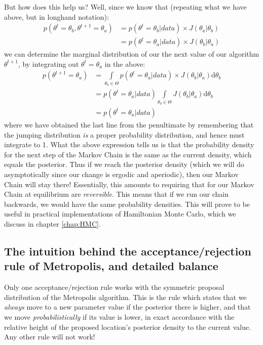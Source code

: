 \documentclass[11pt,fullpage]{book}
\begin{document}
But how does this help us? Well, since we know that (repeating what we have above, but in longhand notation):
%
\begin{align}
p(\theta^{t} = \theta_b,\theta^{t+1}=\theta_a) &=  p(\theta^t=\theta_b|data)\times J(\theta_a|\theta_b)\\
&= p(\theta^t=\theta_a|data)\times J(\theta_b|\theta_a)
\end{align}
%
we can determine the marginal distribution of our the next value of our algorithm $\theta^{t+1}$, by integrating out $\theta^t=\theta_a$ in the above:
%
\begin{align}
p(\theta^{t+1}=\theta_a) &=  \int\limits_{\theta_b\in\Theta} p(\theta^t=\theta_a|data)\times J(\theta_b|\theta_a) \mathrm{d}\theta_b\\
&= p(\theta^t=\theta_a|data)\int\limits_{\theta_b\in\Theta}J(\theta_b|\theta_a) \mathrm{d}\theta_b\\
&= p(\theta^t=\theta_a|data)
\end{align}
%
where we have obtained the last line from the penultimate by remembering that the jumping distribution \textit{is} a proper probability distribution, and hence must integrate to 1. What the above expression tells us is that the probability density for the next step of the Markov Chain is the same as the current density, which equals the posterior. Thus if we reach the posterior density (which we will do asymptotically since our change is ergodic and aperiodic), then our Markov Chain will stay there!  Essentially, this amounts to requiring that for our Markov Chain at equilibrium are \textit{reversible}. This means that if we run our chain backwards, we would have the same probability densities. This will prove to be useful in practical implementations of Hamiltonian Monte Carlo, which we discuss in chapter \ref{chap:HMC}.

\subsection{The intuition behind the acceptance/rejection rule of Metropolis, and detailed balance}\label{sec:metropolisHastings_correctAcceptRejectRuleDetailedBalance}
Only one acceptance/rejection rule works with the symmetric proposal distribution of the Metropolis algorithm. This is the rule which states that we \textit{always} move to a new parameter value if the posterior there is higher, and that we move \textit{probabilistically} if its value is lower, in exact accordance with the relative height of the proposed location's posterior density to the current value. Any other rule will not work!
\end{document}
